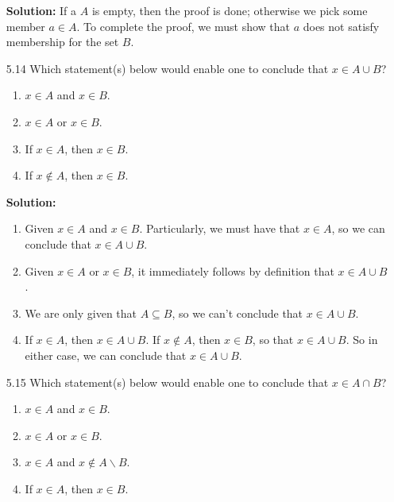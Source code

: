 \begin{enumerate}
      \textbf{Solution:} If a $A$ is empty, then the proof is done; otherwise we
      pick some member $a \in A$. To complete the proof, we must show that $a$
      does not satisfy membership for the set $B$.
   \item[5.14] Which statement(s) below would enable one to conclude that
               $x \in A \cup B$?
               \begin{enumerate}
                  \item $x \in A$ and $x \in B$.
                  \item $x \in A$ or $x \in B$.
                  \item If $x \in A$, then $x \in B$.
                  \item If $x \notin A$, then $x \in B$.
               \end{enumerate}
               
      \textbf{Solution:}
      
      \begin{enumerate}
         \item Given $x \in A$ and $x \in B$. Particularly, we must have that
               $x \in A$, so we can conclude that $x \in A \cup B$.
         \item Given $x \in A$ or $x \in B$, it immediately follows by
               definition that $x \in A \cup B$.
         \item We are only given that $A \subseteq B$, so we can't conclude that 
               $x \in A \cup B$.
         \item If $x \in A$, then $x \in A \cup B$. If $x \notin A$, then
               $x \in B$, so that $x \in A \cup B$. So in either case, we can
               conclude that $x \in A \cup B$.
      \end{enumerate}
   \item[5.15] Which statement(s) below would enable one to conclude that
               $x \in A \cap B$?
               \begin{enumerate}
                  \item $x \in A$ and $x \in B$.
                  \item $x \in A$ or $x \in B$.
                  \item $x \in A$ and $x \notin A{\backslash}B$.
                  \item If $x \in A$, then $x \in B$.
               \end{enumerate}
               

\end{enumerate}
